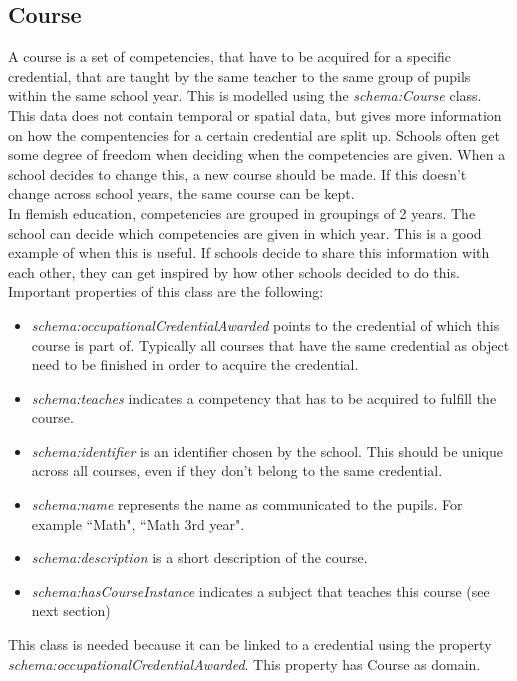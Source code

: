 \documentclass[a4paper]{report}
\begin{document}
    \subsection{Course}
    A course is a set of competencies, that have to be acquired for a specific credential, that are taught by the same teacher to the same group of pupils within the same school year.
    This is modelled using the \textit{schema:Course} class.\\
    This data does not contain temporal or spatial data, but gives more information on how the compentencies for a certain credential are split up. Schools often get some degree of freedom when deciding when the competencies are given.
    When a school decides to change this, a new course should be made. If this doesn't change across school years, the same course can be kept.\\
    In flemish education, competencies are grouped in groupings of 2 years. The school can decide which competencies are given in which year. This is a good example of when this is useful.
    If schools decide to share this information with each other, they can get inspired by how other schools decided to do this.
    Important properties of this class are the following:
    \begin{itemize}
        \item \emph{schema:occupationalCredentialAwarded} points to the credential of which this course is part of. 
        Typically all courses that have the same credential as object need to be finished in order to acquire the credential.
        \item \emph{schema:teaches} indicates a competency that has to be acquired to fulfill the course.
        \item \emph{schema:identifier} is an identifier chosen by the school. This should be unique across all courses, even if they don't belong to the same credential.
        \item \emph{schema:name} represents the name as communicated to the pupils. For example ``Math", ``Math 3rd year".
        \item \emph{schema:description} is a short description of the course. 
        \item \emph{schema:hasCourseInstance} indicates a subject that teaches this course (see next section)
    \end{itemize}
    This class is needed because it can be linked to a credential using the property \textit{schema:occupationalCredentialAwarded}. This property has Course as domain.
\end{document}
